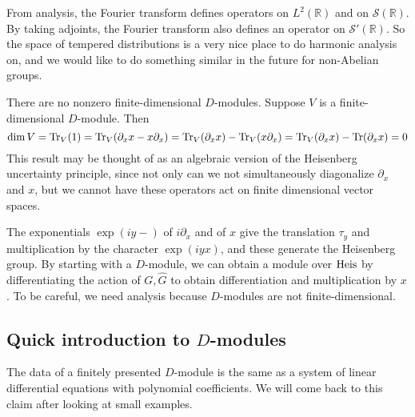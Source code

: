 \documentclass[../../rtnotes.tex]{subfiles}
\begin{document}
From analysis, the Fourier transform defines operators on $L^2(\mathbb R)$ and on $\mathcal S(\mathbb R)$. By taking adjoints, the Fourier transform also defines an operator on $\mathcal S'(\mathbb R)$. So the space of tempered distributions is a very nice place to do harmonic analysis on, and we would like to do something similar in the future for non-Abelian groups.

There are no nonzero finite-dimensional $D$-modules. Suppose $V$ is a finite-dimensional $D$-module. Then
\[\dim V = \Tr_V(1) = \Tr_V(\partial_xx-x\partial_x) = \Tr_V(\partial_xx)-\Tr_V(x\partial_x) = \Tr_V(\partial_xx)-\Tr(\partial_xx) = 0\]
This result may be thought of as an algebraic version of the Heisenberg uncertainty principle, since not only can we not simultaneously diagonalize $\partial_x$ and $x$, but we cannot have these operators act on finite dimensional vector spaces.

The exponentials $\exp(iy-)$ of $i\partial_x$ and of $x$ give the translation $\tau_{y}$ and multiplication by the character $\exp(iyx)$, and these generate the Heisenberg group. By starting with a $D$-module, we can obtain a module over $\operatorname{Heis}$ by differentiating the action of $G,\widehat G$ to obtain differentiation and multiplication by $x$. To be careful, we need analysis because $D$-modules are not finite-dimensional.

\subsection{Quick introduction to $D$-modules}
The data of a finitely presented $D$-module is the same as a system of linear differential equations with polynomial coefficients. We will come back to this claim after looking at small examples.
\end{document}

